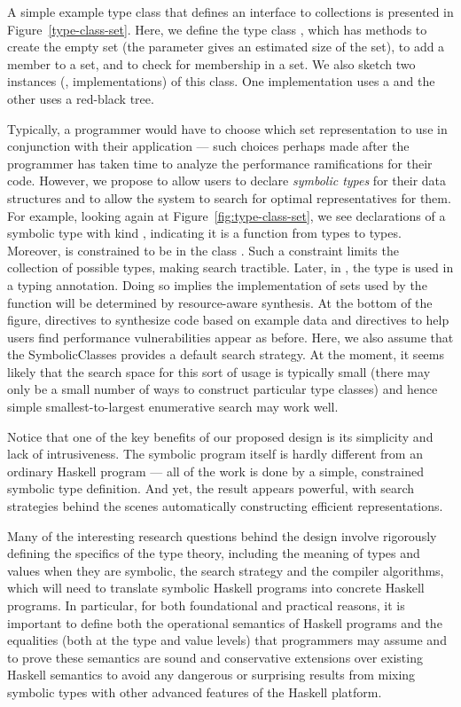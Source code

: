 A simple example type class that defines an interface to collections is presented in 
Figure~\ref{type-class-set}.  Here, we define the type class , which has methods
 to create the empty set (the parameter gives an estimated size of the set),  to add a member to a set, and 
to check for membership in a set.  We also sketch two instances (\ie, implementations) of this
class.  One implementation uses a  and the other uses a red-black tree.

Typically, a programmer would have to choose which set representation to use in conjunction with their
application --- such choices perhaps made after the programmer has taken time to analyze the performance
ramifications for their code.  However, we propose to allow users to declare \emph{symbolic types} for their
data structures and to allow the system to search for optimal representatives for them.  For example,
looking again at Figure~\ref{fig:type-class-set}, we see declarations of a symbolic type 
with kind \cd{* -> *}, indicating it is a function from types to types.  Moreover,  is constrained
to be in the class .  Such a constraint limits the collection of possible types, making search
tractible.  Later, in , the type  is used in a typing annotation.  Doing so
implies the implementation of sets used by the  function will be determined by resource-aware
synthesis.  At the bottom of the figure, directives to synthesize code based on example data and directives
to help users find performance vulnerabilities appear as before.  Here, we also assume that the SymbolicClasses
\rasp provides a default search strategy.  At the moment, it seems likely that the search space for this
sort of usage is typically small (there may only be a small number of ways to construct particular type
classes) and hence simple smallest-to-largest enumerative search may work well.  

Notice that one of the key benefits of our proposed design is its simplicity and lack of intrusiveness.
The symbolic program itself is hardly different from an ordinary Haskell program --- all of the work is
done by a simple, constrained symbolic type definition.  And yet, the result appears powerful, with
search strategies behind the scenes automatically constructing efficient representations.

Many of the interesting research questions behind the design involve rigorously defining the specifics of the
type theory, including the meaning of types and values when they are symbolic, the search strategy and
the compiler algorithms, which will need to translate symbolic Haskell programs into concrete Haskell programs.
In particular, for both foundational and practical reasons, it is important to define both the operational
semantics of Haskell programs and the equalities (both at the type and value levels) that programmers
may assume and to prove these semantics are sound and conservative extensions over existing Haskell semantics
to avoid any dangerous or surprising results from mixing symbolic types with other advanced features of
the Haskell platform.

